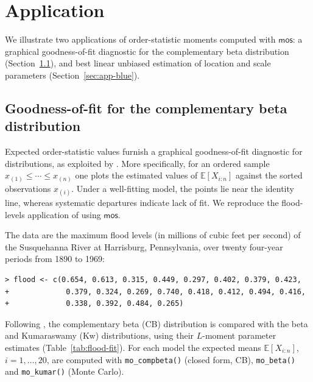 \documentclass[twoside]{article}
\begin{document}
\section{Application}
\label{sec:application}
We illustrate two applications of order-statistic moments computed with $\mathsf{mos}$: a
graphical goodness-of-fit diagnostic for the complementary beta distribution
(Section~\ref{sec:app-gof}), and best linear unbiased estimation of location and
scale parameters (Section~\ref{sec:app-blue}).
\subsection{Goodness-of-fit for the complementary beta distribution}
\label{sec:app-gof}
Expected order-statistic values furnish a graphical goodness-of-fit
diagnostic for distributions, as exploited by
\cite{Makouei2021}. More specifically, for an ordered sample $x_{(1)}\le\cdots\le x_{(n)}$ one plots
the estimated values of $\mathbb{E}[X_{i:n}]$ against the sorted observations $x_{(i)}$.
Under a well-fitting model, the points lie near the identity line, whereas
systematic departures indicate lack of fit. We reproduce the flood-levels
application of \cite{Makouei2021} using $\mathsf{mos}$.

The data are the maximum flood levels (in millions of cubic feet per second) of
the Susquehanna River at Harrisburg, Pennsylvania, over twenty four-year periods
from 1890 to 1969:

\begin{verbatim}
> flood <- c(0.654, 0.613, 0.315, 0.449, 0.297, 0.402, 0.379, 0.423,
+             0.379, 0.324, 0.269, 0.740, 0.418, 0.412, 0.494, 0.416,
+             0.338, 0.392, 0.484, 0.265)
\end{verbatim}
\par\smallskip
Following \cite{Makouei2021}, the complementary beta (CB) distribution is
compared with the beta and Kumaraswamy (Kw) distributions, using their
$L$-moment parameter estimates (Table~\ref{tab:flood-fit}). For each model the
expected means $\mathbb{E}[X_{i:n}]$, $i=1,\ldots,20$, are computed with
\texttt{mo\_compbeta()} (closed form, CB), \texttt{mo\_beta()} and
\texttt{mo\_kumar()} (Monte Carlo).
\end{document}
